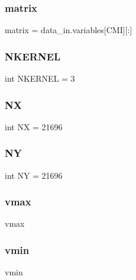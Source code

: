 \mbox{\label{namespacemain_af439574c0feeeae882d3b65a7b2e88bf}} 
\subsubsection{matrix}
{\footnotesize\ttfamily matrix = data\+\_\+in.\+variables[\textquotesingle{}C\+MI\textquotesingle{}][\+:]}

\mbox{\label{namespacemain_a0ed318157b0de78302ca944f622aa044}} 
\subsubsection{N\+K\+E\+R\+N\+EL}
{\footnotesize\ttfamily int N\+K\+E\+R\+N\+EL = 3}

\mbox{\label{namespacemain_ab304b26016ce886af898dfdaed93a120}} 
\subsubsection{NX}
{\footnotesize\ttfamily int NX = 21696}

\mbox{\label{namespacemain_a7fb159d0f2febd3c31b799dd641e8da7}} 
\subsubsection{NY}
{\footnotesize\ttfamily int NY = 21696}

\mbox{\label{namespacemain_ac1a7ae143b847c0d61e8abc668d3d1fa}} 
\subsubsection{vmax}
{\footnotesize\ttfamily vmax}

\mbox{\label{namespacemain_aa8bf729ba75cfc1e378ba8b5a4ef782b}} 
\subsubsection{vmin}
{\footnotesize\ttfamily vmin}

